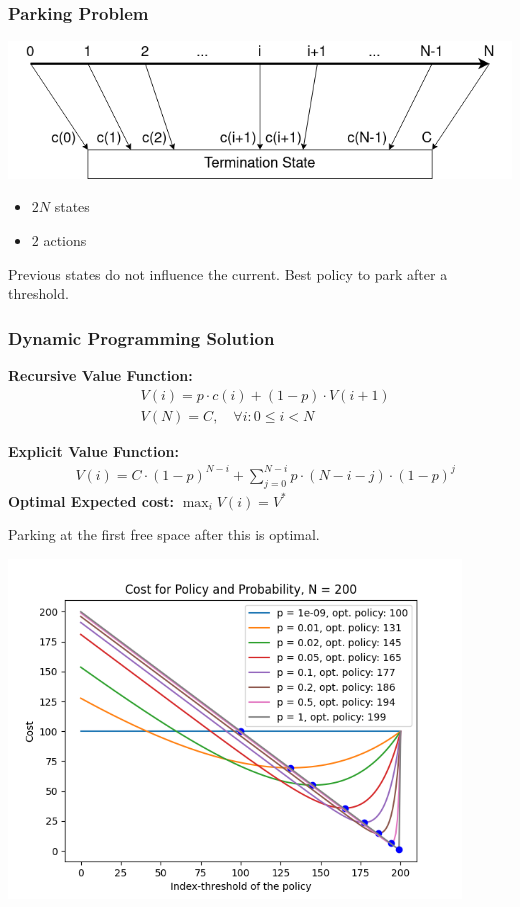 \documentclass{beamer}
\begin{document}
\begin{frame}
	\frametitle{Parking Problem}
	\includegraphics[width=1\textwidth]{figures/parking_graphic.png}\\
	\begin{itemize}
		\item $2 N$ states
		\item $2$ actions
	\end{itemize}
	Previous states do not influence the current. 
	Best policy to park after a threshold.
\end{frame}

\begin{frame}
	\frametitle{Dynamic Programming Solution}
	\vspace{-0.3cm}	
	\textbf{Recursive Value Function:}
	\begin{equation*}
		\begin{split}
			&V(i) = p \cdot c(i) + (1-p) \cdot V(i+1)\\
			&V(N) = C, \quad \forall i \colon0 \leq i < N
		\end{split}
	\end{equation*}
	
	\textbf{Explicit Value Function:}
	\vspace{-0.3cm}
	\begin{equation*}
		\begin{split}
			&V(i) = C \cdot (1-p)^{N-i} + \sum_{j=0}^{N-i} p \cdot (N-i-j) \cdot (1-p)^{j}
		\end{split}
	\end{equation*}
	\textbf{Optimal Expected cost:} $\max_i V(i) = V^* $
	\vspace{0.3cm}
	
	Parking at the first free space after this is optimal.
\end{frame}

\begin{frame}
	\includegraphics[width=0.9\textwidth]{figures/strategy_probabilities_200.png}
\end{frame}
\end{document}
